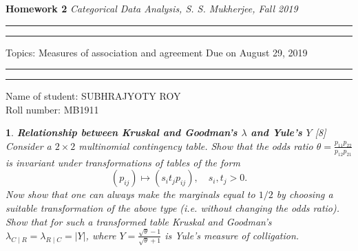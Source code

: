 \documentclass[12pt]{article}
\theoremstyle{problemstyle}
\newtheorem{problem}{}
\begin{document}
\begin{center}{\large\textbf{Homework 2} \hfill \large \textit{Categorical Data Analysis, S. S. Mukherjee, Fall 2019}} 
\end{center}
\hrule\hrule\vskip3pt
Topics: Measures of association and agreement \hfill Due on August 29, 2019\vskip3pt
\hrule\hrule\vskip3pt\noindent
Name of student: SUBHRAJYOTY ROY \\
Roll number: MB1911
\vskip3pt\noindent	
\begin{problem}
\textbf{Relationship between Kruskal and Goodman's $\lambda$ and Yule's $Y$} \hfill [8]\vskip3pt\noindent
Consider a $2 \times 2$ multinomial contingency table. Show that the odds ratio $\theta = \frac{p_{11} p_{22}}{p_{12}p_{21}}$ is invariant under transformations of tables of the form
\[
    (p_{ij}) \mapsto (s_i t_j p_{ij}), \quad s_i, t_j > 0.
\]
Now show that one can always make the marginals equal to $1/2$ by choosing a suitable transformation of the above type (i.e. without changing the odds ratio). Show that for such a transformed table Kruskal and Goodman's $\lambda_{C\mid R} = \lambda_{R \mid C} = |Y|$, where $Y = \frac{\sqrt{\theta} - 1}{\sqrt{\theta} + 1}$ is Yule's measure of colligation.
\end{problem}
\end{document}
